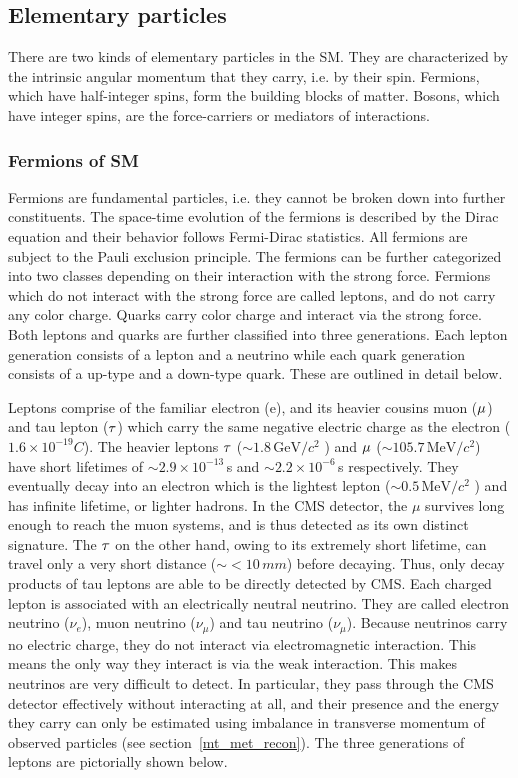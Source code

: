 \subsection{Elementary particles}
There are two kinds of elementary particles in the SM. They are characterized by the intrinsic angular momentum that they carry, i.e. by their spin. Fermions, which have half-integer spins, form the building blocks of matter. Bosons, which have integer spins, are the force-carriers or mediators of interactions.

\subsubsection{Fermions of SM}
\label{fermions}
Fermions are fundamental particles, i.e. they cannot be broken down into further constituents. The space-time evolution of the fermions is described by the Dirac equation and their behavior follows Fermi-Dirac statistics. All fermions are subject to the Pauli exclusion principle. The fermions can be further categorized into two classes depending on their interaction with the strong force. Fermions which do not interact with the strong force are called leptons, and do not carry any color charge. Quarks carry color charge and interact via the strong force. Both leptons and quarks are further classified into three generations. Each lepton generation consists of a lepton and a neutrino while each quark generation consists of a up-type and a down-type quark. These are outlined in detail below.

Leptons comprise of the familiar electron (e), and its heavier cousins muon ($\mu$) and tau lepton ($\tau$) which carry the same negative electric charge as the electron ($1.6\times10^{-19} C$).  The heavier leptons $\tau$ ($\sim 1.8\,\mathrm{GeV}/c^2$ ) and $\mu$ ($\sim 105.7\,\mathrm{MeV}/c^2$) have short lifetimes of $\sim 2.9\times 10^{-13}\,$s and $\sim 2.2\times 10^{-6}\,$s respectively. They eventually decay into an electron which is the lightest lepton ($\sim 0.5\,\mathrm{MeV}/c^2$ ) and has infinite lifetime, or lighter hadrons. In the CMS detector, the $\mu$ survives long enough to reach the muon systems, and is thus detected as its own distinct signature. The $\tau$ on the other hand, owing to its extremely short lifetime, can travel only a very short distance ($\sim <10\,mm$) before decaying. Thus, only decay products of tau leptons are able to be directly detected by CMS. Each charged lepton is associated with an electrically neutral neutrino. They are called electron neutrino ($\nu_e$), muon neutrino ($\nu_{\mu}$) and tau neutrino ($\nu_{\mu}$). Because neutrinos carry no electric charge, they do not interact via electromagnetic interaction. This means the only way they interact is via the weak interaction. This makes neutrinos are very difficult to detect. In particular, they pass through the CMS detector effectively without interacting at all, and their presence and the energy they carry can only be estimated using imbalance in transverse momentum of observed particles (see section~\ref{mt_met_recon}). The three generations of leptons are pictorially shown below. 

